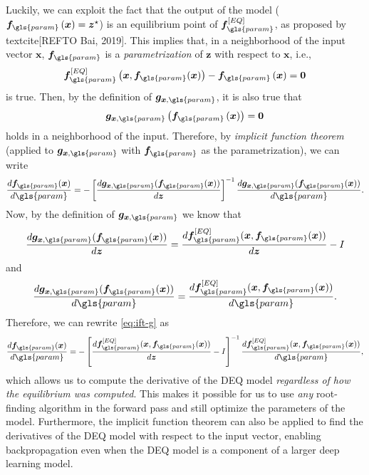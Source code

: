 Luckily, we can exploit the fact that the output of the model ($\bm{f}_{\gls{param}}\left( \bm{x} \right) = \bm{z}^{\star}$) is an equilibrium point of $\bm{f}_{\gls{param}}^{[EQ]}$, as proposed by textcite[REFTO Bai, 2019].
This implies that, in a neighborhood of the input vector $\bm{x}$, $\bm{f}_{\gls{param}}$ is a \emph{parametrization} of $\bm{z}$ with respect to $\bm{x}$, i.e., \[
    \bm{f}_{\gls{param}}^{[EQ]}\left( \bm{x},\bm{f}_{\gls{param}}(\bm{x}) \right) -\bm{f}_{\gls{param}}\left( \bm{x} \right) = \bm{0}
\] is true. Then, by the definition of $\bm{g}_{\bm{x},\gls{param}}$, it is also true that \[
\bm{g}_{\bm{x},\gls{param}}\left( \bm{f}_{\gls{param}}\left( \bm{x} \right) \right) = \bm{0}
\] holds in a neighborhood of the input.
Therefore, by \emph{implicit function theorem} (applied to $\bm{g}_{\bm{x},\gls{param}}$ with $\bm{f}_{\gls{param}}$ as the parametrization), we can write
\begin{equation}\label{eq:ift-g}
    \frac{d \bm{f}_{\gls{param}}(\bm{x})}{d \gls{param}} = - \left[ \frac{d \bm{g}_{\bm{x},\gls{param}}(\bm{f}_{\gls{param}}(\bm{x}))}{d \bm{z}} \right]^{-1} \frac{d \bm{g}_{\bm{x},\gls{param}}(\bm{f}_{\gls{param}}(\bm{x}))}{d \gls{param}}
.\end{equation}
Now, by the definition of $\bm{g}_{\bm{x},\gls{param}}$ we know that \[
    \frac{d \bm{g}_{\bm{x},\gls{param}}(\bm{f}_{\gls{param}}(\bm{x}))}{d \bm{z}} = \frac{d \bm{f}_{\gls{param}}^{[EQ]}(\bm{x},\bm{f}_{\gls{param}}(\bm{x}))}{d \bm{z}} - I 
\] and \[
\frac{d \bm{g}_{\bm{x},\gls{param}}(\bm{f}_{\gls{param}}(\bm{x}))}{d \gls{param}} = \frac{d \bm{f}_{\gls{param}}^{[EQ]}(\bm{x},\bm{f}_{\gls{param}}(\bm{x}))}{d \gls{param}}
.\] Therefore, we can rewrite \eqref{eq:ift-g} as
\begin{equation}\label{eq:deq-jacobian}
    \frac{d \bm{f}_{\gls{param}}(\bm{x})}{d \gls{param}} = - \left[ \frac{d \bm{f}_{\gls{param}}^{[EQ]}(\bm{x},\bm{f}_{\gls{param}}(\bm{x}))}{d \bm{z}} - I \right]^{-1} \frac{d \bm{f}_{\gls{param}}^{[EQ]}(\bm{x},\bm{f}_{\gls{param}}(\bm{x}))}{d \gls{param}}
,\end{equation}
which allows us to compute the derivative of the \gls{DEQ} model \emph{regardless of how the equilibrium was computed}.
This makes it possible for us to use \emph{any} root-finding algorithm in the forward pass and still optimize the parameters of the model.
Furthermore, the implicit function theorem can also be applied to find the derivatives of the DEQ model with respect to the input vector, enabling backpropagation even when the \gls{DEQ} model is a component of a larger deep learning model.

